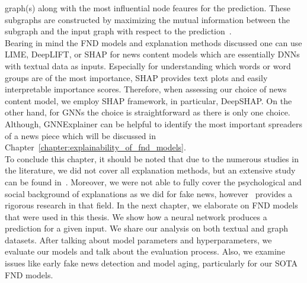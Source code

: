 graph(s) along with the most influential node feaures for the prediction. These subgraphs are constructed by maximizing the mutual information between the subgraph and the input graph with respect to the
prediction~\parencite{GNNExplainer_Ying}.\\
Bearing in mind the FND models and explanation methods discussed one can use LIME, DeepLIFT, or SHAP for news content models which are essentially DNNs with textual data as inputs. Especially for understanding which words or word groups are of the most importance, SHAP provides text plots and easily interpretable importance scores. Therefore, when assessing our choice of news content model, we employ SHAP framework, in particular, DeepSHAP. On the other hand, for GNNs the choice is straightforward as there is only one choice. Although, GNNExplainer can be helpful to identify the most important spreaders of a news piece which will be discussed in Chapter~\ref{chapter:explainability_of_fnd_models}.\\
To conclude this chapter, it should be noted that due to the numerous studies in the literature, we did not cover all explanation methods, but an extensive study can be found in~\parencite{InterpretableML_Molnar}. Moreover, we were not able to fully cover the psychological and social background of explanations as we did for fake news, however~\cite{ExplanationInAI_Miller} provides a rigorous research in that field. In the next chapter, we elaborate on FND models that were used in this thesis. We show how a neural network produces a prediction for a given input. We share our analysis on both textual and graph datasets. After talking about model parameters and hyperparameters, we evaluate our models and talk about the evaluation process. Also, we examine issues like early fake news detection and model aging, particularly for our SOTA FND models.
